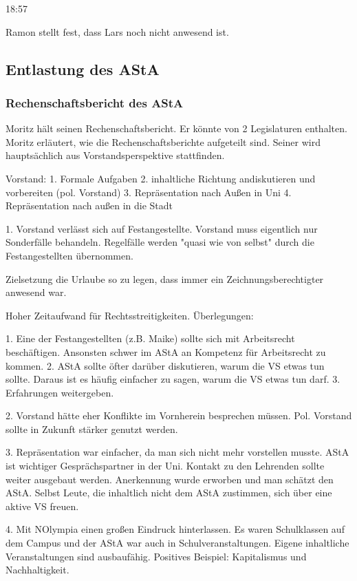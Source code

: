 \documentclass[ngerman,headheight=70pt]{scrartcl}
\begin{document}
    18:57

    Ramon stellt fest, dass Lars noch nicht anwesend ist.

    \subsection{Entlastung des AStA}

    \subsubsection{Rechenschaftsbericht des AStA}

    Moritz hält seinen Rechenschaftsbericht. Er könnte von 2 Legislaturen enthalten.
    Moritz erläutert, wie die Rechenschaftsberichte aufgeteilt sind. Seiner
    wird hauptsächlich aus Vorstandsperspektive stattfinden.

    Vorstand:
    1. Formale Aufgaben
    2. inhaltliche Richtung andiskutieren und vorbereiten (pol. Vorstand)
    3. Repräsentation nach Außen in Uni
    4. Repräsentation nach außen in die Stadt

    1.
    Vorstand verlässt sich auf Festangestellte. Vorstand muss eigentlich nur
    Sonderfälle behandeln. Regelfälle werden "quasi wie von selbst" durch die
    Festangestellten übernommen.

    Zielsetzung die Urlaube so zu legen, dass immer ein Zeichnungsberechtigter
    anwesend war.

    Hoher Zeitaufwand für Rechtsstreitigkeiten.
    Überlegungen:

    1. Eine der Festangestellten (z.B. Maike) sollte sich mit
    Arbeitsrecht beschäftigen. Ansonsten schwer im AStA an Kompetenz für Arbeitsrecht
    zu kommen.
    2. AStA sollte öfter darüber diskutieren, warum die VS etwas tun sollte.
    Daraus ist es häufig einfacher zu sagen, warum die VS etwas tun darf.
    3. Erfahrungen weitergeben.

    2.
    Vorstand hätte eher Konflikte im Vornherein besprechen müssen. Pol. Vorstand
    sollte in Zukunft stärker genutzt werden.

    3.
    Repräsentation war einfacher, da man sich nicht mehr vorstellen musste.
    AStA ist wichtiger Gesprächspartner in der Uni. Kontakt zu den Lehrenden
    sollte weiter ausgebaut werden. Anerkennung wurde erworben und man schätzt
    den AStA. Selbst Leute, die inhaltlich nicht dem AStA zustimmen, sich über
    eine aktive VS freuen.

    4.
    Mit NOlympia einen großen Eindruck hinterlassen. Es waren Schulklassen auf
    dem Campus und der AStA war auch in Schulveranstaltungen. Eigene inhaltliche
    Veranstaltungen sind ausbaufähig. Positives Beispiel: Kapitalismus und Nachhaltigkeit.
\end{document}
